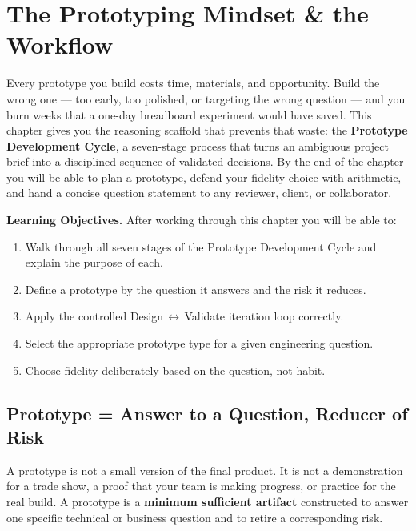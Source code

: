 \chapter{The Prototyping Mindset \& the Workflow}
\label{ch2}

Every prototype you build costs time, materials, and opportunity.
Build the wrong one --- too early, too polished, or targeting the wrong
question --- and you burn weeks that a one-day breadboard experiment would
have saved.
This chapter gives you the reasoning scaffold that prevents that waste: the
\textbf{Prototype Development Cycle}, a
seven-stage process that turns an ambiguous project brief into a disciplined
sequence of validated decisions.
By the end of the chapter you will be able to plan a prototype, defend your
fidelity choice with arithmetic, and hand a concise question statement to
any reviewer, client, or collaborator.

\bigskip
\noindent\textbf{Learning Objectives.}
After working through this chapter you will be able to:
\begin{enumerate}
  \item Walk through all seven stages of the Prototype Development Cycle and
        explain the purpose of each.
  \item Define a prototype by the question it answers and the risk it reduces.
  \item Apply the controlled Design\,$\leftrightarrow$\,Validate iteration
        loop correctly.
  \item Select the appropriate prototype type for a given engineering question.
  \item Choose fidelity deliberately based on the question, not habit.
\end{enumerate}

\section{Prototype = Answer to a Question, Reducer of Risk}
\label{sec:ch2-question}

A prototype is not a small version of the final product.
It is not a demonstration for a trade show, a proof that your team is
making progress, or practice for the real build.
A prototype is a \textbf{minimum sufficient artifact}
constructed to answer one specific technical or business question and to
retire a corresponding risk.

